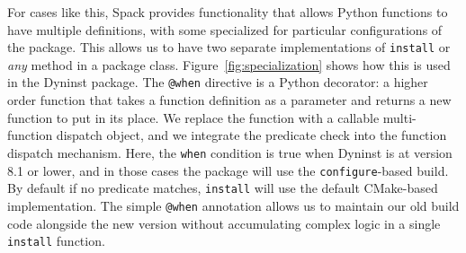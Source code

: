 For cases like this, Spack provides functionality that allows Python functions to have
multiple definitions, with some specialized for particular configurations of the package.
This allows us to have two separate implementations of {\tt install} or {\it any} method 
in a package class. Figure~\ref{fig:specialization} shows how this is used in the Dyninst
package.  The {\tt @when} directive is a Python decorator: a higher order function that 
takes a function definition as a parameter and returns a new function to put in its place.
We replace the function with a callable multi-function dispatch object, and we 
integrate the predicate check into the function dispatch mechanism.  Here, the
{\tt when} condition is true when Dyninst is at version 8.1 or lower, and in those cases
the package will use the {\tt configure}-based build.  By default if no predicate matches,
{\tt install} will use the default CMake-based implementation. The simple {\tt @when}
annotation allows us to maintain our old build code alongside the new version without 
accumulating complex logic in a single {\tt install} function.





















